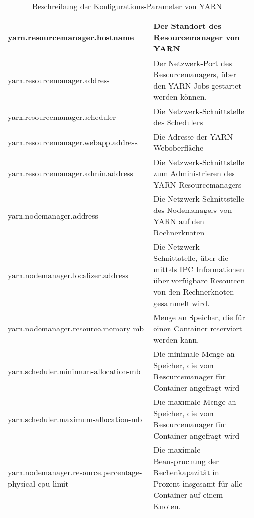 \begin{appendices}
\begin{table}
	\begin{tabularx}{\textwidth}{| X | X |} \hline
	yarn.resourcemanager.hostname & Der Standort des Resourcemanager von YARN \\ \hline
	yarn.resourcemanager.address &  Der Netzwerk-Port des Resourcemanagers, über den YARN-Jobs gestartet werden können.\\ \hline
	yarn.resourcemanager.scheduler & Die Netzwerk-Schnittstelle des Schedulers\\ \hline
	yarn.resourcemanager.webapp.address & Die Adresse der YARN-Weboberfläche\\ \hline
	yarn.resourcemanager.admin.address & Die Netzwerk-Schnittstelle zum Administrieren des YARN-Resourcemanagers\\ \hline
	yarn.nodemanager.address & Die Netzwerk-Schnittstelle des Nodemanagers von YARN auf den Rechnerknoten\\ \hline
	yarn.nodemanager.localizer.address & Die Netzwerk-Schnittstelle, über die mittels IPC
	Informationen über verfügbare Resourcen von den Rechnerknoten gesammelt wird.\\ \hline
	yarn.nodemanager.resource.memory-mb &  Menge an Speicher, die für einen Container reserviert werden kann.\\ \hline
	yarn.scheduler.minimum-allocation-mb &  Die minimale Menge an Speicher, die vom Resourcemanager für Container angefragt wird\\ \hline
	yarn.scheduler.maximum-allocation-mb &  Die maximale Menge an Speicher, die vom Resourcemanager für Container angefragt wird\\ \hline
	yarn.nodemanager.resource.percentage-physical-cpu-limit & Die maximale Beanspruchung der Rechenkapazität in Prozent insgesamt für alle Container auf einem Knoten. \\ \hline
	\end{tabularx}
	\caption{Beschreibung der Konfigurations-Parameter von YARN}
	\label{config:yarnDescription}
\end{table}


\end{appendices}
